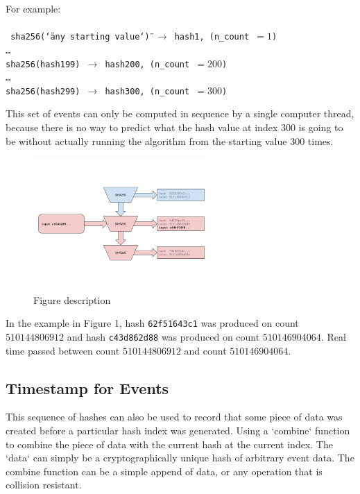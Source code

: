 \documentclass[12pt]{article}
\begin{document}
\noindent For example:\\\\\noindent
\texttt{
 sha256(\char`\"any starting value\char`\") $\rightarrow$ hash1, (n\_count~$=1$)\\
\ldots\\
sha256(hash199) $\rightarrow$ hash200, (n\_count~$=200$)\\
\ldots\\
sha256(hash299) $\rightarrow$ hash300, (n\_count~$=300$)\\
}

This set of events can only be computed in sequence by a single computer thread, because there is no way to predict what the hash value at index $300$ is going to be without actually running the algorithm from the starting value $300$ times.

\begin{figure}
  \begin{center}
    \centering
    \includegraphics[width=0.6\textwidth]{figures/fig_2.png}
    \caption[Fig 2]{Figure description \label{fig_2}}
  \end{center}
  \end{figure}

In the example in Figure 1, hash \texttt{62f51643c1} was produced on
count $510144806912$ and hash \texttt{c43d862d88} was produced on
count $510146904064$. Real time passed between count $510144806912$
and count $510146904064$.

\subsection{Timestamp for Events}

This sequence of hashes can also be used to record that some piece of data was created before a particular hash index was generated.  Using a `combine` function to combine the piece of data with the current hash at the current index. The `data` can simply be a cryptographically unique hash of arbitrary event data. The combine function can be a simple append of data, or any operation that is collision resistant.\\
\end{document}
